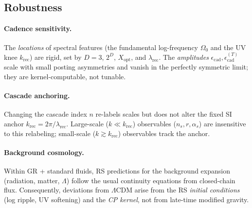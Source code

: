 \documentclass[11pt]{article}
\theoremstyle{definition}
\theoremstyle{remark}
\begin{document}
\subsection{Robustness}

\paragraph{Cadence sensitivity.}
The \emph{locations} of spectral features (the fundamental log-frequency \(\Omega_0\) and the UV knee \(k_{\mathrm{rec}}\)) are rigid, set by \(D=3\), \(2^D\), \(X_{\mathrm{opt}}\), and \(\lambda_{\mathrm{rec}}\). The \emph{amplitudes} \(\epsilon_{\mathrm{cad}},\epsilon^{(T)}_{\mathrm{cad}}\) scale with small posting asymmetries and vanish in the perfectly symmetric limit; they are kernel-computable, not tunable.

\paragraph{Cascade anchoring.}
Changing the cascade index \(n\) re-labels scales but does not alter the fixed SI anchor \(k_{\mathrm{rec}}=2\pi/\lambda_{\mathrm{rec}}\). Large-scale (\(k\ll k_{\mathrm{rec}}\)) observables (\(n_s,r,\alpha_s\)) are insensitive to this relabeling; small-scale (\(k\gtrsim k_{\mathrm{rec}}\)) observables track the anchor.

\paragraph{Background cosmology.}
Within GR + standard fluids, RS predictions for the background expansion (radiation, matter, \(\Lambda\)) follow the usual continuity equations from closed-chain flux. Consequently, deviations from \(\Lambda\)CDM arise from the RS \emph{initial conditions} (log ripple, UV softening) and the \emph{CP kernel}, not from late-time modified gravity.
\end{document}
